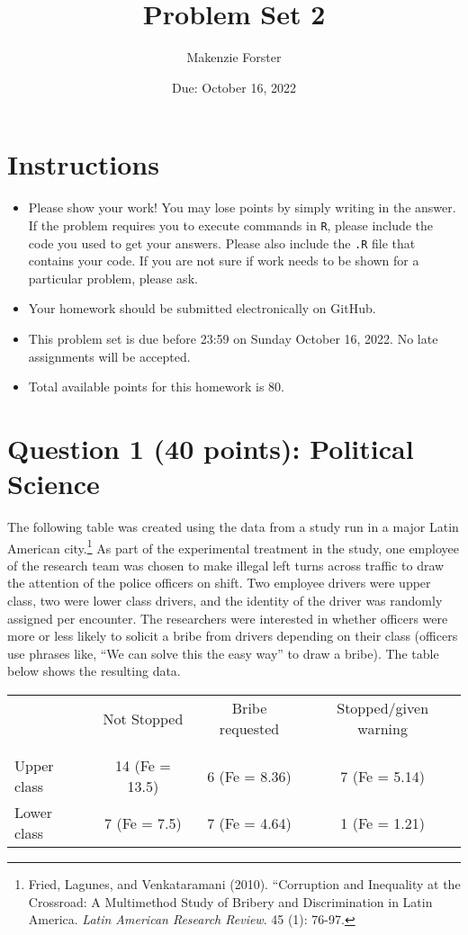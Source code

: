\documentclass[12pt,letterpaper]{article}
\title{Problem Set 2}
\date{Due: October 16, 2022}
\author{Makenzie Forster}
\begin{document}
	\maketitle
	\section*{Instructions}
\begin{itemize}
	\item Please show your work! You may lose points by simply writing in the answer. If the problem requires you to execute commands in \texttt{R}, please include the code you used to get your answers. Please also include the \texttt{.R} file that contains your code. If you are not sure if work needs to be shown for a particular problem, please ask.
	\item Your homework should be submitted electronically on GitHub.
	\item This problem set is due before 23:59 on Sunday October 16, 2022. No late assignments will be accepted.
	\item Total available points for this homework is 80.
\end{itemize}

	
	\vspace{.5cm}
	\section*{Question 1 (40 points): Political Science}
		\vspace{.25cm}
	The following table was created using the data from a study run in a major Latin American city.\footnote{Fried, Lagunes, and Venkataramani (2010). ``Corruption and Inequality at the Crossroad: A Multimethod Study of Bribery and Discrimination in Latin America. \textit{Latin American Research Review}. 45 (1): 76-97.} As part of the experimental treatment in the study, one employee of the research team was chosen to make illegal left turns across traffic to draw the attention of the police officers on shift. Two employee drivers were upper class, two were lower class drivers, and the identity of the driver was randomly assigned per encounter. The researchers were interested in whether officers were more or less likely to solicit a bribe from drivers depending on their class (officers use phrases like, ``We can solve this the easy way'' to draw a bribe). The table below shows the resulting data.

\newpage
\begin{table}[h!]
	\centering
	\begin{tabular}{l | c c c }
		& Not Stopped & Bribe requested & Stopped/given warning \\
		\\[-1.8ex] 
		\hline \\[-1.8ex]
		Upper class & 14 (Fe =  13.5) & 6 (Fe  = 8.36)  & 7 (Fe = 5.14) \\
		Lower class & 7 (Fe = 7.5) & 7 (Fe = 4.64) & 1 (Fe  = 1.21) \\
		\hline
	\end{tabular}
\end{table}
\end{document}
